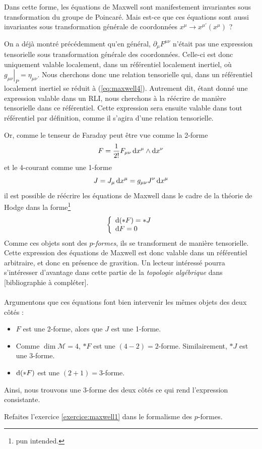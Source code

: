 Dans cette forme, les équations de Maxwell sont manifestement invariantes sous transformation du groupe de Poincaré. Mais est-ce que ces équations sont aussi invariantes sous transformation générale de coordonnées $x^{\mu} \to x^{\mu '}(x^{\mu})$ ?

On a déjà montré précédemment qu'en général, $\partial_{\mu}F^{\mu \nu}$ n'était pas une expression tensorielle sous transformation générale des coordonnées. Celle-ci est donc uniquement valable localement, dans un référentiel localement inertiel, où $\left. g_{\mu \nu}\right|_P = \eta_{\mu \nu}$. Nous cherchons donc une relation tensorielle qui, dans un référentiel localement inertiel se réduit à (\ref{eq:maxwell4}). Autrement dit, étant donné une expression valable dans un RLI, nous cherchons à la réécrire de manière tensorielle dans ce référentiel. Cette expression sera ensuite valable dans tout référentiel par définition, comme il s'agira d'une relation tensorielle.

Or, comme le tenseur de Faraday peut être vue comme la 2-forme
\begin{equation}
    F = \frac{1}{2!} F_{\mu\nu} \, \mathrm{d} x^\mu \wedge \mathrm{d} x^\nu
\end{equation}
et le 4-courant comme une 1-forme
\begin{equation}
    J = J_\mu \,\mathrm{d} x^\mu = g_{\mu\nu} J^\nu \,\mathrm{d} x^\mu
\end{equation}
il est possible de réécrire les équations de Maxwell dans le cadre de la théorie de Hodge dans la forme\footnote{pun intended.}
\begin{align}
\label{eq:Maxwell formes}
    \left\{
\begin{array}{l}
\mathrm{d} (*F) = *J\\
\mathrm{d} F = 0
\end{array}
\right.
\end{align}
Comme ces objets sont des $p$-\emph{formes}, ils se transforment de manière tensorielle. Cette expression des équations de Maxwell est donc valable dans un référentiel arbitraire, et donc en présence de gravition. Un lecteur intéressé pourra s'intéresser d'avantage dans cette partie de la \emph{topologie algébrique} dans [bibliographie à compléter].\\
\\
Argumentons que ces équations font bien intervenir les mêmes objets des deux côtés : 
\begin{itemize}
    \item $F$ est une 2-forme, alors que $J$ est une 1-forme.
    \item Comme $\dim \mathcal{M} = 4$, $*F$ est une $(4-2) = 2$-forme. Similairement, $*J$ est une 3-forme.
    \item $\mathrm{d} (*F)$ est une $(2+1) = 3$-forme.
\end{itemize}
Ainsi, nous trouvons une 3-forme des deux côtés ce qui rend l'expression consistante.
\begin{exerc}
    Refaites l'exercice \ref{exercice:maxwell1} dans le formalisme des $p$-formes.
\end{exerc}
